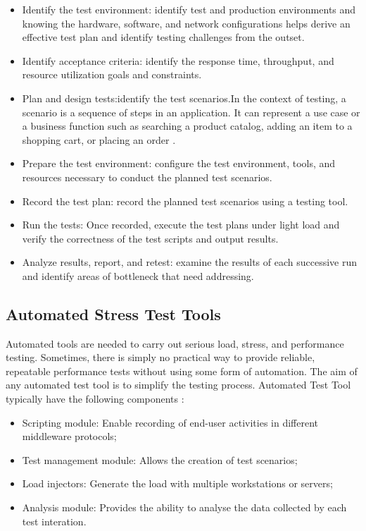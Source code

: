 \documentclass[times]{stvrauth}
\begin{document}
\begin{itemize}
\item Identify the test environment: identify test and production environments and knowing the hardware, software, and network configurations helps derive an effective test plan and identify testing challenges from the outset.

\item Identify acceptance criteria: identify the response time, throughput, and resource utilization goals and constraints.

\item Plan and design tests:identify the test scenarios.In the context of testing, a scenario is a sequence of steps in an application. It can represent a use case or a business function such as searching a product catalog, adding an item to a shopping cart, or placing an order \cite{Corporation2007}.

\item Prepare the test environment: configure the test environment, tools, and resources necessary to conduct the planned test scenarios.

\item Record the test plan: record the planned test scenarios using a testing tool.

\item Run the tests: Once recorded, execute the test plans under light load and verify the correctness of the test scripts and output results.

\item Analyze results, report, and retest: examine the results of each successive run and identify areas of bottleneck that need addressing.  

\end{itemize}



\subsection{Automated Stress Test Tools}

Automated tools are needed to carry out serious load, stress, and performance testing. Sometimes, there is simply no practical way to provide reliable, repeatable performance tests without using some form of automation. The aim of any automated test tool is to simplify the testing process. Automated Test Tool  typically have the following components \cite{Molyneaux2009}:

\begin{itemize}
\item Scripting module: Enable recording of end-user activities in different middleware protocols;
\item Test management module: Allows the creation of test scenarios;
\item Load injectors: Generate the load with multiple workstations or servers;
\item Analysis module: Provides the ability to analyse the data collected by each test interation.
\end{itemize}
\end{document}
